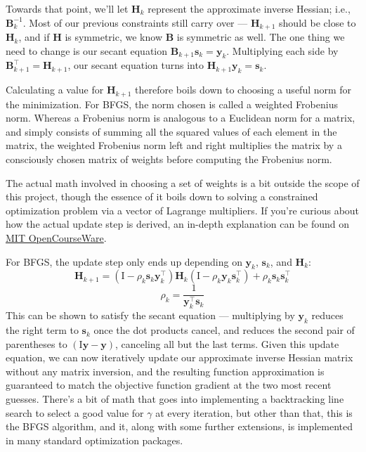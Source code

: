 \documentclass[12pt]{article}
\begin{document}
Towards that point, we'll let \(\mathbf{H}_k\) represent the approximate inverse Hessian; i.e., \(\mathbf{B}_{k}^{-1}\). Most of our previous 
constraints still carry over --- \(\mathbf{H}_{k+1}\) should be close to \(\mathbf{H}_k\), and if \(\mathbf{H}\) is 
symmetric, we know \(\mathbf{B}\) is symmetric as well. The one thing we need to change is our secant equation 
\(\mathbf{B}_{k+1} \mathbf{s}_k = \mathbf{y}_k\). Multiplying each side by \(\mathbf{B}_{k+1}^\top = \mathbf{H}_{k+1}\), our secant equation turns
into \(\mathbf{H}_{k+1} \mathbf{y}_k = \mathbf{s}_k\).

Calculating a value for \(\mathbf{H}_{k+1}\) therefore boils down to choosing a useful norm for the minimization. For BFGS,
the norm chosen is called a weighted Frobenius norm. Whereas a Frobenius norm is analogous to a Euclidean norm for a matrix, and
simply consists of summing all the squared values of each element in the matrix, the weighted Frobenius norm 
left and right multiplies the matrix by a consciously chosen matrix of weights before computing the Frobenius norm.

The actual math involved in choosing a set of weights is a bit outside the scope of this project, though the essence of it boils down to solving a constrained optimization problem via a vector of 
Lagrange multipliers. If you're curious about how the actual update step is derived, an in-depth explanation can be found 
on \href{https://ocw.mit.edu/courses/18-335j-introduction-to-numerical-methods-spring-2019/1b52b607c223977b35ba1d826e4d8df1_MIT18_335JS19_lec30.pdf}{MIT OpenCourseWare}.\cite{johnson-quasi-newton}

For BFGS, the update step only ends up depending on \(\mathbf{y}_k\), \(\mathbf{s}_k\), and \(\mathbf{H}_k\):
\[\mathbf{H}_{k+1} = (\mathrm{I} - \rho_k \mathbf{s}_k \mathbf{y}_k^\top)\mathbf{H}_k(\mathrm{I} - \rho_k \mathbf{y}_k \mathbf{s}_k^\top) + \rho_k \mathbf{s}_k \mathbf{s}_k^\top\]
\[\rho_k = \frac{1}{\mathbf{y}_k^\top \mathbf{s}_k}\]
This can be shown to satisfy the secant equation --- multiplying by \(\mathbf{y}_k\) reduces the right term to \(\mathbf{s}_k\)
once the dot products cancel, and reduces the second pair of parentheses to \((\mathrm{I}\mathbf{y} - \mathbf{y})\), canceling all but the 
last terms. Given this update equation, we can now iteratively update our approximate inverse Hessian matrix without any
matrix inversion, and the resulting function approximation is guaranteed to match the objective function gradient at the two most recent
guesses. There's a bit of math that goes into implementing a backtracking line search to select a good value for 
\(\gamma\) at every iteration, but other than that, this is the BFGS algorithm, and it, along with some further extensions, is 
implemented in many standard optimization packages. 
\end{document}
